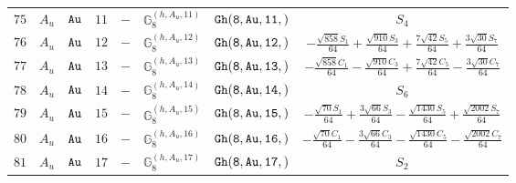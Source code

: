 \documentclass[fleqn,8pt]{jsarticle}
\begin{document}
\begin{table}[ht!]
\begin{center}
\begin{tabular}{cccccccc}
$ 75 $ & $ A_{u} $ & $ {\tt Au} $ & $ 11 $ & $ - $ & $ \mathbb{G}_{8}^{(h,A_{u},11)} $ & $ {\tt Gh(8,Au,11,)} $ & $ S_{4} $ \\
$ 76 $ & $ A_{u} $ & $ {\tt Au} $ & $ 12 $ & $ - $ & $ \mathbb{G}_{8}^{(h,A_{u},12)} $ & $ {\tt Gh(8,Au,12,)} $ & $ - \frac{\sqrt{858} S_{1}}{64} + \frac{\sqrt{910} S_{3}}{64} + \frac{7 \sqrt{42} S_{5}}{64} + \frac{3 \sqrt{30} S_{7}}{64} $ \\
$ 77 $ & $ A_{u} $ & $ {\tt Au} $ & $ 13 $ & $ - $ & $ \mathbb{G}_{8}^{(h,A_{u},13)} $ & $ {\tt Gh(8,Au,13,)} $ & $ - \frac{\sqrt{858} C_{1}}{64} - \frac{\sqrt{910} C_{3}}{64} + \frac{7 \sqrt{42} C_{5}}{64} - \frac{3 \sqrt{30} C_{7}}{64} $ \\
$ 78 $ & $ A_{u} $ & $ {\tt Au} $ & $ 14 $ & $ - $ & $ \mathbb{G}_{8}^{(h,A_{u},14)} $ & $ {\tt Gh(8,Au,14,)} $ & $ S_{6} $ \\
$ 79 $ & $ A_{u} $ & $ {\tt Au} $ & $ 15 $ & $ - $ & $ \mathbb{G}_{8}^{(h,A_{u},15)} $ & $ {\tt Gh(8,Au,15,)} $ & $ - \frac{\sqrt{70} S_{1}}{64} + \frac{3 \sqrt{66} S_{3}}{64} - \frac{\sqrt{1430} S_{5}}{64} + \frac{\sqrt{2002} S_{7}}{64} $ \\
$ 80 $ & $ A_{u} $ & $ {\tt Au} $ & $ 16 $ & $ - $ & $ \mathbb{G}_{8}^{(h,A_{u},16)} $ & $ {\tt Gh(8,Au,16,)} $ & $ - \frac{\sqrt{70} C_{1}}{64} - \frac{3 \sqrt{66} C_{3}}{64} - \frac{\sqrt{1430} C_{5}}{64} - \frac{\sqrt{2002} C_{7}}{64} $ \\
$ 81 $ & $ A_{u} $ & $ {\tt Au} $ & $ 17 $ & $ - $ & $ \mathbb{G}_{8}^{(h,A_{u},17)} $ & $ {\tt Gh(8,Au,17,)} $ & $ S_{2} $ \\
 \hline \hline
\end{tabular}
\end{center}
\end{table}
\end{document}
